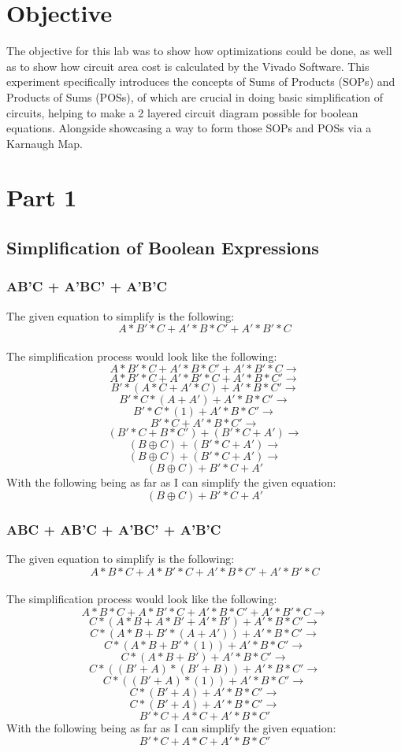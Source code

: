 \section{Objective}
The objective for this lab was to show how optimizations could be done, as well as to show how circuit area cost is calculated by the Vivado Software. This experiment specifically introduces the concepts of Sums of Products (SOPs) and Products of Sums (POSs), of which are crucial in doing basic simplification of circuits, helping to make a 2 layered circuit diagram possible for boolean equations. Alongside showcasing a way to form those SOPs and POSs via a Karnaugh Map.


\section{Part 1}
\subsection{Simplification of Boolean Expressions}
\subsubsection{AB'C + A'BC' + A'B'C}
The given equation to simplify is the following: $$A*B'*C + A'*B*C' + A'*B'*C$$\\
The simplification process would look like the following:
$$A*B'*C + A'*B*C' + A'*B'*C\rightarrow$$
$$A*B'*C + A'*B'*C + A'*B*C'\rightarrow$$
$$B'*(A*C + A'*C) + A'*B*C'\rightarrow$$
$$B'*C*(A + A') + A'*B*C'\rightarrow$$
$$B'*C*(1) + A'*B*C'\rightarrow$$
$$B'*C + A'*B*C'\rightarrow$$
$$(B'*C + B*C') + (B'*C + A')\rightarrow$$
$$(B \oplus C) + (B'*C + A')\rightarrow$$
$$(B \oplus C) + (B'*C + A')\rightarrow$$
$$(B \oplus C) + B'*C + A'$$
With the following being as far as I can simplify the given equation:
$$(B \oplus C) + B'*C + A'$$
\subsubsection{ABC + AB'C + A'BC' + A'B'C}
The given equation to simplify is the following: $$A*B*C + A*B'*C + A'*B*C' + A'*B'*C$$\\
The simplification process would look like the following:
$$A*B*C + A*B'*C + A'*B*C' + A'*B'*C\rightarrow$$
$$C*(A*B + A*B' + A'*B') + A'*B*C'\rightarrow$$
$$C*(A*B + B'*(A + A')) + A'*B*C'\rightarrow$$
$$C*(A*B + B'*(1)) + A'*B*C'\rightarrow$$
$$C*(A*B + B') + A'*B*C'\rightarrow$$
$$C*((B' + A)*(B' + B)) + A'*B*C'\rightarrow$$
$$C*((B' + A)*(1)) + A'*B*C'\rightarrow$$
$$C*(B' + A) + A'*B*C'\rightarrow$$
$$C*(B' + A) + A'*B*C'\rightarrow$$
$$B'*C + A*C + A'*B*C'$$
With the following being as far as I can simplify the given equation:
$$B'*C + A*C + A'*B*C'$$

